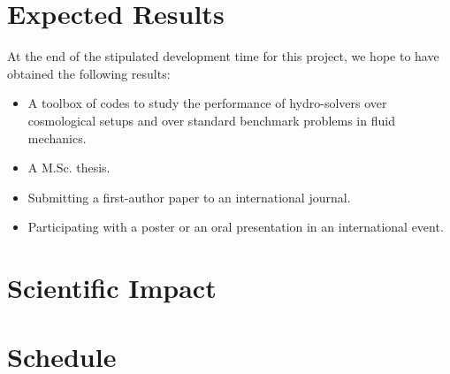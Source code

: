 \documentclass[a4,useAMS,usenatbib,usegraphicx,12pt]{article}
\begin{document}
\section{Expected Results}
At the end of the stipulated development time for this project, we hope to have
obtained the following results:
\begin{itemize}
\item A toolbox of codes to study the performance of hydro-solvers over 
cosmological setups and over standard benchmark problems in fluid mechanics.
\item A M.Sc. thesis.
\item Submitting a first-author paper to an international journal.
\item Participating with a poster or an oral presentation in an international
event.
\end{itemize}

\section{Scientific Impact}


\section{Schedule}
\end{document}
